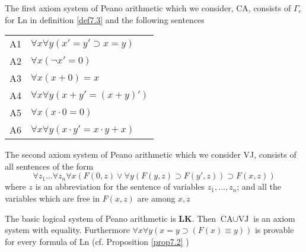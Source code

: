 \documentclass[11pt]{article}
\def \LK {\textbf{LK}}
\def \CA {\text{CA}}
\def \VJ {\text{VJ}}
\begin{document}
\begin{definition}[]
The first axiom system of Peano arithmetic which we consider,  CA, consists of \(\Gamma_e\) for
Ln in definition \ref{def7.3} and the following sentences

\begin{center}
\begin{tabular}{ll}
A1 & \(\forall x\forall y(x'=y'\supset x=y)\)\\
A2 & \(\forall x(\neg x'=0)\)\\
A3 & \(\forall x(x+0)=x\)\\
A4 & \(\forall x \forall y (x+y'=(x+y)')\)\\
A5 & \(\forall x(x\cdot 0=0)\)\\
A6 & \(\forall x \forall y(x\cdot y'=x\cdot y+x)\)\\
\end{tabular}
\end{center}

The second axiom system of Peano arithmetic which we consider VJ, consists of all sentences of
the form
\begin{equation*}
\forall z_1 \dots \forall z_n \forall x(F(0,z)\vee \forall y(F(y,z)\supset F(y',z))\supset F(x,z))
\end{equation*}
where \(z\) is an abbreviation for the sentence of variables \(z_1,\dots,z_n\); and all the
variables which are free in \(F(x,z)\) are among \(x,z\)

The basic logical system of Peano arithmetic is \(\LK\). Then \(\CA\cup\VJ\) is an axiom system
with equality. Furthermore \(\forall x\forall y(x=y\supset(F(x)\equiv y))\) is provable for every
formula of Ln (cf. Proposition \ref{prop7.2} )
\end{definition}
\end{document}

